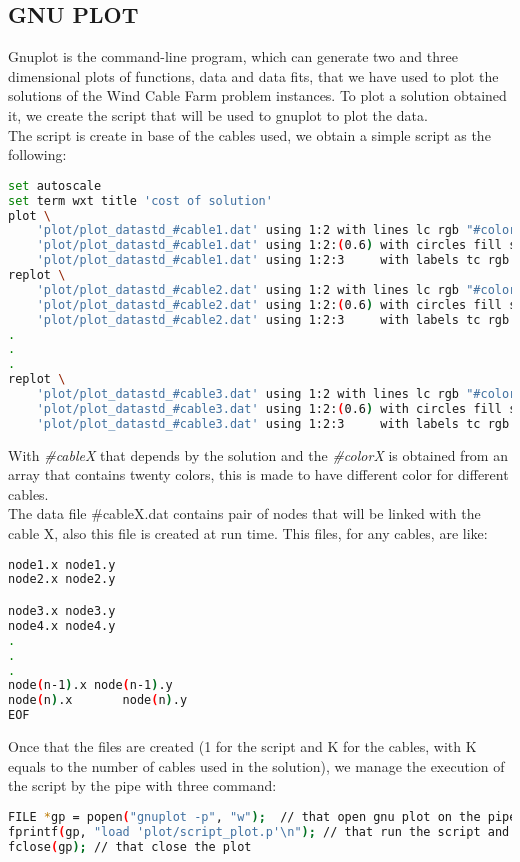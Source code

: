 \begin{appendices}
\chapter{GNU PLOT}
Gnuplot is the command-line program, which can generate two and three dimensional plots of functions, data and data fits, that we have used to plot the solutions of the Wind Cable Farm problem instances.
To plot a solution obtained it, we create the script that will be used to gnuplot to plot the data.\\
The script is create in base of the cables used, we obtain a simple script as the following:
\begin{lstlisting}[language=bash,caption={Gnuplot script}]
set autoscale
set term wxt title 'cost of solution'
plot \
	'plot/plot_datastd_#cable1.dat' using 1:2 with lines lc rgb "#color1" lw 2 title "Cable 1",\
	'plot/plot_datastd_#cable1.dat' using 1:2:(0.6) with circles fill solid lc rgb "black" notitle,\
	'plot/plot_datastd_#cable1.dat' using 1:2:3     with labels tc rgb "black" offset (0,0) font 'Arial Bold' notitle
replot \
	'plot/plot_datastd_#cable2.dat' using 1:2 with lines lc rgb "#color2" lw 2 title "Cable 2",\
	'plot/plot_datastd_#cable2.dat' using 1:2:(0.6) with circles fill solid lc rgb "black" notitle,\
	'plot/plot_datastd_#cable2.dat' using 1:2:3     with labels tc rgb "black" offset (0,0) font 'Arial Bold' notitle
.
.
.
replot \
	'plot/plot_datastd_#cable3.dat' using 1:2 with lines lc rgb "#color3" lw 2 title "Cable 3",\
	'plot/plot_datastd_#cable3.dat' using 1:2:(0.6) with circles fill solid lc rgb "black" notitle,\
	'plot/plot_datastd_#cable3.dat' using 1:2:3     with labels tc rgb "black" offset (0,0) font 'Arial Bold' notitle

\end{lstlisting}
With \textit{\#cableX} that depends by the solution and the \textit{\#colorX } is obtained from an array that contains twenty colors, this is made to have different color for different cables.\\
The data file \#cableX.dat contains pair of nodes that will be linked with the cable X, also this file is created at run time. This files, for any cables, are like:
\newpage
\begin{lstlisting}[language=bash,caption={Data file containing cables}]
node1.x	node1.y
node2.x	node2.y

node3.x	node3.y
node4.x	node4.y
.
.
.
node(n-1).x	node(n-1).y
node(n).x		node(n).y
EOF
\end{lstlisting}
Once that the files are created (1 for the script and K for the cables, with K equals to the number of cables used in the solution), we manage the execution of the script by the pipe with three command:
\begin{lstlisting}[language=bash,caption={Script execution}]
FILE *gp = popen("gnuplot -p", "w");  // that open gnu plot on the pipe 
fprintf(gp, "load 'plot/script_plot.p'\n"); // that run the script and show the plot
fclose(gp); // that close the plot
\end{lstlisting}




\end{appendices}
